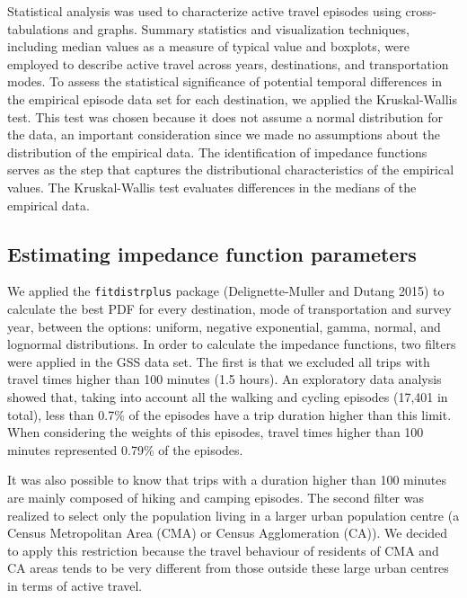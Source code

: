 \documentclass[preprint, 3p,
authoryear]{elsarticle} %
\begin{document}
Statistical analysis was used to characterize active travel episodes
using cross-tabulations and graphs. Summary statistics and visualization
techniques, including median values as a measure of typical value and
boxplots, were employed to describe active travel across years,
destinations, and transportation modes. To assess the statistical
significance of potential temporal differences in the empirical episode
data set for each destination, we applied the Kruskal-Wallis test. This
test was chosen because it does not assume a normal distribution for the
data, an important consideration since we made no assumptions about the
distribution of the empirical data. The identification of impedance
functions serves as the step that captures the distributional
characteristics of the empirical values. The Kruskal-Wallis test
evaluates differences in the medians of the empirical data.

\hypertarget{estimating-impedance-function-parameters}{%
\subsection{Estimating impedance function
parameters}\label{estimating-impedance-function-parameters}}

We applied the \texttt{fitdistrplus} package (Delignette-Muller and
Dutang 2015) to calculate the best PDF for every destination, mode of
transportation and survey year, between the options: uniform, negative
exponential, gamma, normal, and lognormal distributions. In order to
calculate the impedance functions, two filters were applied in the GSS
data set. The first is that we excluded all trips with travel times
higher than 100 minutes (1.5 hours). An exploratory data analysis showed
that, taking into account all the walking and cycling episodes (17,401
in total), less than 0.7\% of the episodes have a trip duration higher
than this limit. When considering the weights of this episodes, travel
times higher than 100 minutes represented 0.79\% of the episodes.

It was also possible to know that trips with a duration higher than 100
minutes are mainly composed of hiking and camping episodes. The second
filter was realized to select only the population living in a larger
urban population centre (a Census Metropolitan Area (CMA) or Census
Agglomeration (CA)). We decided to apply this restriction because the
travel behaviour of residents of CMA and CA areas tends to be very
different from those outside these large urban centres in terms of
active travel.
\end{document}

